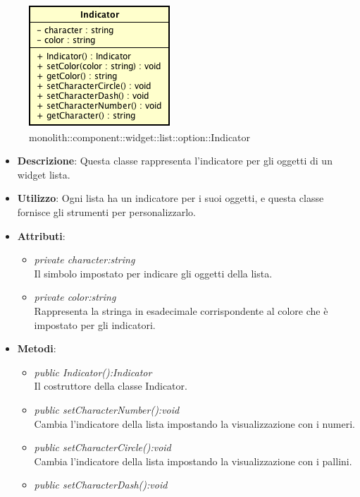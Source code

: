 \label{monolith::component::widget::list::option::Indicator}
\begin{figure}[H]
	\centering
	\includegraphics[scale=0.5]{Sezioni/SottosezioniST/img/Indicator.png}
	\caption{monolith::component::widget::list::option::Indicator}
\end{figure}

\begin{itemize}
\item \textbf{Descrizione}: Questa classe rappresenta l'indicatore per gli oggetti di un widget lista.
\item \textbf{Utilizzo}: Ogni lista ha un indicatore per i suoi oggetti, e questa classe fornisce gli strumenti per personalizzarlo.
\item \textbf{Attributi}:
	\begin{itemize}
	\item \textit{private character:string}\\
	Il simbolo impostato per indicare gli oggetti della lista.
	\item \textit{private color:string}\\
	Rappresenta la stringa in esadecimale corrispondente al colore che è impostato per gli indicatori.
	\end{itemize}
\item \textbf{Metodi}:
	\begin{itemize}
	\item \textit{public Indicator():Indicator}\\
	Il costruttore della classe Indicator.
	\item \textit{public setCharacterNumber():void}\\
	Cambia l'indicatore della lista impostando la visualizzazione con i numeri.
	\item \textit{public setCharacterCircle():void}\\
	Cambia l'indicatore della lista impostando la visualizzazione con i pallini.
	\item \textit{public setCharacterDash():void}\\

\end{itemize}
\end{itemize}
